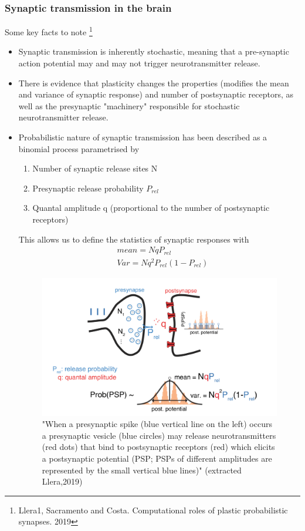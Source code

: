 \documentclass[main]{subfiles}
\begin{document}
\subsubsection{Synaptic transmission in the brain}
Some key facts to note \footnote{Llera1, Sacramento and Costa. Computational roles of plastic probabilistic synapses. 2019}
\begin{itemize}
    \item Synaptic transmission is inherently stochastic, meaning that a pre-synaptic action potential may and may not trigger neurotransmitter release.
    \item There is evidence that plasticity changes the properties (modifies the mean and variance of 
    synaptic response) and number of postsynaptic receptors, as well as the presynaptic "machinery" responsible for stochastic neurotransmitter release.
    \item Probabilistic nature of synaptic transmission has been described as a binomial process parametrised by
        \begin{enumerate}
            \item Number of synaptic release sites N
            \item Presynaptic release probability $P_{rel}$
            \item Quantal amplitude q (proportional to the number of postsynaptic receptors)
        \end{enumerate}
    This allows us to define the statistics of synaptic responses with
    \begin{equation}
        \begin{split}
            & mean = N q P_{rel}\\
            & Var = N q^2 P_{rel} (1-P_{rel})
        \end{split}
    \end{equation}
 
    \begin{figure}[H]
    	\centering
    	\includegraphics[width=0.9\linewidth]{05_LearningAsBayesianInference/figures/synaptic_tx_model.png}
    	\caption{"When a presynaptic spike (blue vertical line on the left) occurs a presynaptic vesicle (blue circles) may release neurotransmitters (red dots) that bind to postsynaptic receptors (red) which elicits a postsynaptic potential (PSP; PSPs of different amplitudes are represented by the small vertical blue lines)" (extracted Llera,2019)} 
    	\label{fig:synaptic_tx}
    \end{figure}
    

\end{itemize}
\end{document}

